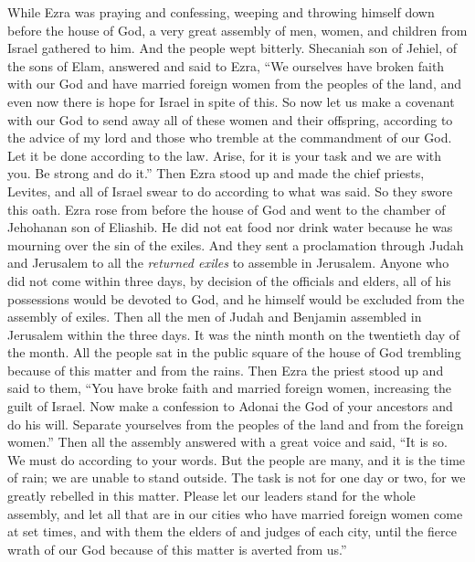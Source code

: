 \begin{biblechapter} %
 While Ezra was praying and confessing, weeping and throwing himself down before the house of God, a very great assembly of men, women, and children from Israel gathered to him. And the people wept bitterly.
\verse Shecaniah son of Jehiel, of the sons of Elam, answered and said to Ezra, “We ourselves have broken faith with our God and have married foreign women from the peoples of the land, and even now there is hope for Israel in spite of this.
\verse So now let us make a covenant with our God to send away all of these women and their offspring, according to the advice of my lord and those who tremble at the commandment of our God. Let it be done according to the law.
\verse Arise, for it is your task and we are with you. Be strong and do it.”
\verse Then Ezra stood up and made the chief priests, Levites, and all of Israel swear to do according to what was said. So they swore this oath.
 Ezra rose from before the house of God and went to the chamber of Jehohanan son of Eliashib. He did not eat food nor drink water because he was mourning over the sin of the exiles.
\verse And they sent a proclamation through Judah and Jerusalem to all the \textit{returned exiles} to assemble in Jerusalem.
\verse Anyone who did not come within three days, by decision of the officials and elders, all of his possessions would be devoted to God, and he himself would be excluded from the assembly of exiles.
\verse Then all the men of Judah and Benjamin assembled in Jerusalem within the three days. It was the ninth month on the twentieth day of the month. All the people sat in the public square of the house of God trembling because of this matter and from the rains.
\verse Then Ezra the priest stood up and said to them, “You have broke faith and married foreign women, increasing the guilt of Israel.
\verse Now make a confession to Adonai the God of your ancestors and do his will. Separate yourselves from the peoples of the land and from the foreign women.”
\verse Then all the assembly answered with a great voice and said, “It is so. We must do according to your words.
\verse But the people are many, and it is the time of rain; we are unable to stand outside. The task is not for one day or two, for we greatly rebelled in this matter.
\verse Please let our leaders stand for the whole assembly, and let all that are in our cities who have married foreign women come at set times, and with them the elders of and judges of each city, until the fierce wrath of our God because of this matter is averted from us.”

\end{biblechapter}

